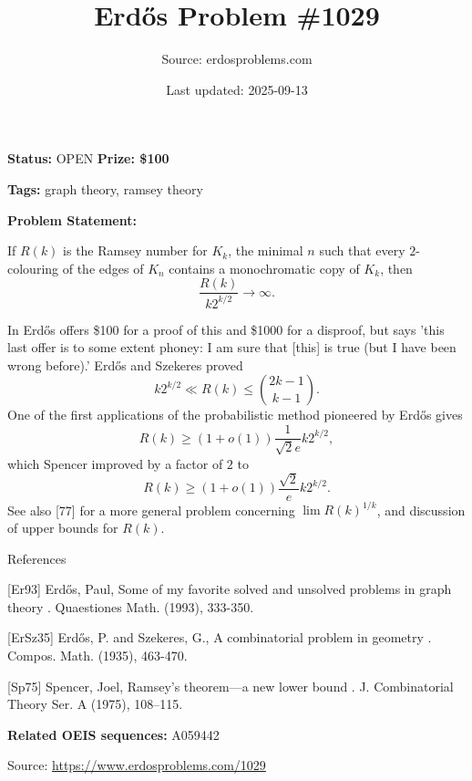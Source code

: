 \documentclass{article}
\title{Erd\H{o}s Problem \#1029}
\date{Last updated: 2025-09-13}
\author{Source: erdosproblems.com}
\begin{document}
\maketitle

\noindent\textbf{Status:} OPEN \quad \textbf{Prize: \$100}

\noindent\textbf{Tags:} graph theory, ramsey theory

\medskip

\noindent\textbf{Problem Statement:}

If $R(k)$ is the Ramsey number for $K_k$, the minimal $n$ such that every $2$-colouring of the edges of $K_n$ contains a monochromatic copy of $K_k$, then\[\frac{R(k)}{k2^{k/2}}\to \infty.\]




In \cite{Er93} Erd\H{o}s offers \$100 for a proof of this and \$1000 for a disproof, but says 'this last offer is to some extent phoney: I am sure that [this] is true (but I have been wrong before).' Erd\H{o}s and Szekeres \cite{ErSz35} proved\[k2^{k/2} \ll R(k) \leq \binom{2k-1}{k-1}.\]One of the first applications of the probabilistic method pioneered by Erd\H{o}s gives\[R(k) \geq (1+o(1))\frac{1}{\sqrt{2}e}k2^{k/2},\]which Spencer \cite{Sp75} improved by a factor of $2$ to\[R(k) \geq (1+o(1))\frac{\sqrt{2}}{e}k2^{k/2}.\]See also [77] for a more general problem concerning $\lim R(k)^{1/k}$, and discussion of upper bounds for $R(k)$.




References

[Er93] Erd\H{o}s, Paul, Some of my favorite solved and unsolved problems in graph theory . Quaestiones Math. (1993), 333-350.

[ErSz35] Erd\H{o}s, P. and Szekeres, G., A combinatorial problem in geometry . Compos. Math. (1935), 463-470.

[Sp75] Spencer, Joel, Ramsey's theorem---a new lower bound . J. Combinatorial Theory Ser. A (1975), 108--115.

\noindent\textbf{Related OEIS sequences:} A059442


\bigskip
\noindent\small{Source: \url{https://www.erdosproblems.com/1029}}
\end{document}
